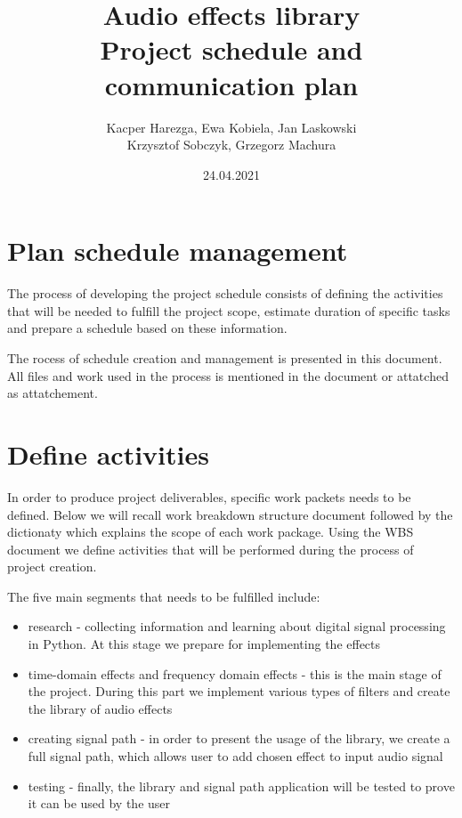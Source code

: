 \documentclass[12pt]{article}
\title{Audio effects library\\Project schedule and communication plan}
\author{Kacper Harezga, Ewa Kobiela, Jan Laskowski\\Krzysztof Sobczyk, Grzegorz Machura}
\date{24.04.2021}
\begin{document}
	
	\maketitle
	\tableofcontents
	\newpage
	
\section{Plan schedule management}

	The process of developing the project schedule consists of defining the activities that will be needed to fulfill the project scope, estimate duration of specific tasks and prepare a schedule based on these information.
	
	The rocess of schedule creation and management is presented in this document. All files and work used in the process is mentioned in the document or attatched as attatchement.

\section{Define activities}

	In order to produce project deliverables, specific work packets needs to be defined. Below we will recall work breakdown structure document followed by the dictionaty which explains the scope of each work package. Using the WBS document we define activities that will be performed during the process of project creation.
	
	The five main segments that needs to be fulfilled include:
	\begin{itemize}
	\item research - collecting information and learning about digital signal processing in Python. At this stage we prepare for implementing the effects
	\item time-domain effects and frequency domain effects - this is the main stage of the project. During this part we implement various types of filters and create the library of audio effects
	\item creating signal path - in order to present the usage of the library, we create a full signal path, which allows user to add chosen effect to input audio signal
	\item testing - finally, the library and signal path application will be tested to prove it can be used by the user
	\end{itemize}
	
\end{document}
